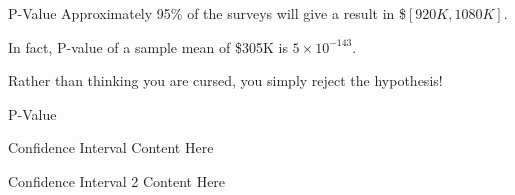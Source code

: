 \documentclass{beamer}\usepackage[]{graphicx}\usepackage[]{color}
\begin{document}
\begin{darkframes}
\begin{frame}[label=lists]{P-Value}
		Approximately 95\% of the surveys will give a result in \$$[920K, 1080K]$. \newline
		
		In fact, P-value of a sample mean of \$305K is $5\times 10^{-143}$. \newline
		
		Rather than thinking you are cursed, you simply reject the hypothesis!
	\end{frame}
	
	
		\begin{frame}[label=lists]{P-Value}
			\begin{figure} 
				\centering
				\setlength\fboxsep{0pt}
				\setlength\fboxrule{0.5pt} 
			\end{figure} 	
	\end{frame}
	
	

	
	\begin{frame}[label=lists]{Confidence Interval}
		Content Here
	\end{frame}
	
	
	\begin{frame}[label=lists]{Confidence Interval 2}
		Content Here
	\end{frame} 
	

\end{darkframes}
  
  
  
\end{document}
